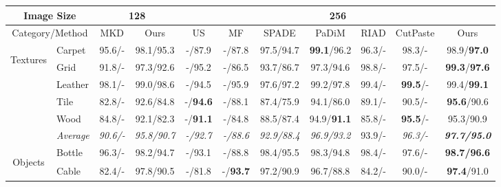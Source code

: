 \documentclass[10pt,twocolumn,letterpaper]{article}
\begin{document}
\begin{table*}[!ht]
\footnotesize
\centering
\begin{tabular}{ccccccccccc}
\hline
\multicolumn{2}{c|}{Image Size} & \multicolumn{2}{c|}{128} & \multicolumn{7}{c}{256} \\ \hline
\multicolumn{2}{c|}{Category/Method} & MKD\cite{mkd} & \multicolumn{1}{c|}{Ours} & US\cite{us} & MF\cite{mf} & SPADE\cite{spade} & PaDiM\cite{padim} & RIAD\cite{riad} & CutPaste\cite{cutpaste} & Ours \\ \hline
\multicolumn{1}{c|}{\multirow{6}{*}{\begin{turn}{90}Textures\end{turn}}} & \multicolumn{1}{l|}{Carpet} & 95.6/- & \multicolumn{1}{c|}{98.1/95.3} & -/87.9 & -/87.8 & 97.5/94.7 & \textbf{99.1}/96.2 & 96.3/- & 98.3/- & 98.9/\textbf{97.0} \\
\multicolumn{1}{c|}{} & \multicolumn{1}{l|}{Grid} & 91.8/- & \multicolumn{1}{c|}{97.3/92.6} & -/95.2 & -/86.5 & 93.7/86.7 & 97.3/94.6 & 98.8/- & 97.5/- & \textbf{99.3}/\textbf{97.6} \\ 
\multicolumn{1}{c|}{} & \multicolumn{1}{l|}{Leather} & 98.1/- & \multicolumn{1}{c|}{99.0/98.6} & -/94.5 & -/95.9 & 97.6/97.2 & 99.2/97.8 & 99.4/- & \textbf{99.5}/- & 99.4/\textbf{99.1} \\  
\multicolumn{1}{c|}{} & \multicolumn{1}{l|}{Tile} & 82.8/- & \multicolumn{1}{c|}{92.6/84.8} & -/\textbf{94.6} & -/88.1 & 87.4/75.9 & 94.1/86.0 & 89.1/- & 90.5/- & \textbf{95.6}/90.6 \\ 
\multicolumn{1}{c|}{} & \multicolumn{1}{l|}{Wood} & 84.8/- & \multicolumn{1}{c|}{92.1/82.3} & -/\textbf{91.1} & -/84.8 & 88.5/87.4 & 94.9/\textbf{91.1} & 85.8/- & \textbf{95.5}/- & 95.3/90.9 \\ \cline{2-11} 
\multicolumn{1}{c|}{} & \multicolumn{1}{l|}{\textit{Average}} & \textit{90.6/-} & \multicolumn{1}{c|}{\textit{95.8/90.7}} & \textit{-/92.7} & \textit{-/88.6} & \textit{92.9/88.4} & \textit{96.9/93.2} & 93.9/- & \textit{96.3/-} & \textit{\textbf{97.7/95.0}} \\ \hline
\multicolumn{1}{c|}{\multirow{11}{*}{\begin{turn}{90}Objects\end{turn}}} & \multicolumn{1}{l|}{Bottle} & 96.3/- & \multicolumn{1}{c|}{98.2/94.7} & -/93.1 & -/88.8 & 98.4/95.5 & 98.3/94.8 & 98.4/- & 97.6/- & \textbf{98.7/96.6} \\ 
\multicolumn{1}{c|}{} & \multicolumn{1}{l|}{Cable} & 82.4/- & \multicolumn{1}{c|}{97.8/90.5} & -/81.8 & -/\textbf{93.7} & 97.2/90.9 & 96.7/88.8 & 84.2/- & 90.0/- & \textbf{97.4}/91.0 \\ 

\end{tabular}
\end{table*}
\end{document}
